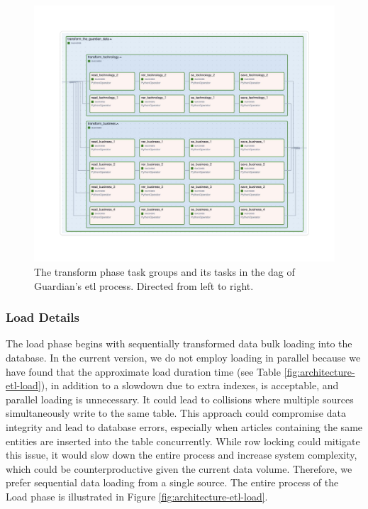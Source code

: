 \begin{figure}[htbp]
    \centering
    \includegraphics[width=\textwidth]{img/architecture/etl-transform.pdf}
    \caption{The transform phase task groups and its tasks in the \acrshort{dag} of Guardian's \acrshort{etl} process. Directed from left to right.}
    \label{fig:architecture-etl-transform}
\end{figure}

\subsubsection{Load Details}
\label{subsubsec:architecture-etl-load-details}
The load phase begins with sequentially transformed data bulk loading into the database. In the current version, we do not employ loading in parallel because we have found that the approximate load duration time (see Table \ref{fig:architecture-etl-load}), in addition to a slowdown due to extra indexes, is acceptable, and parallel loading is unnecessary. It could lead to collisions where multiple sources simultaneously write to the same table. This approach could compromise data integrity and lead to database errors, especially when articles containing the same entities are inserted into the table concurrently. While row locking could mitigate this issue, it would slow down the entire process and increase system complexity, which could be counterproductive given the current data volume. Therefore, we prefer sequential data loading from a single source. The entire process of the Load phase is illustrated in Figure \ref{fig:architecture-etl-load}.

